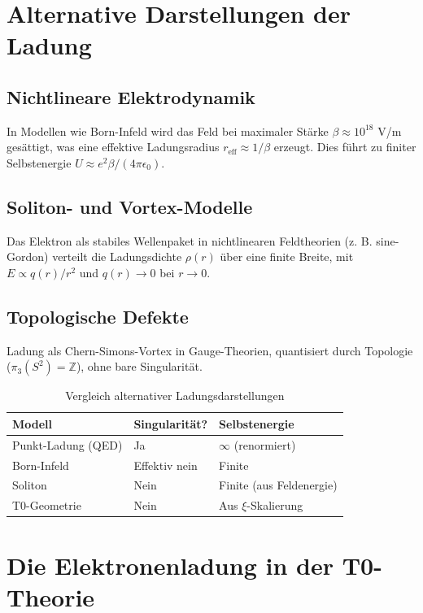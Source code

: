	\section{Alternative Darstellungen der Ladung}
	\label{sec:alternativen}
	
	\subsection{Nichtlineare Elektrodynamik}
	In Modellen wie Born-Infeld wird das Feld bei maximaler Stärke $\beta \approx 10^{18}$ V/m gesättigt, was eine effektive Ladungsradius $r_{\text{eff}} \approx 1/\beta$ erzeugt. Dies führt zu finiter Selbstenergie $U \approx e^2 \beta / (4\pi \epsilon_0)$.
	
	\subsection{Soliton- und Vortex-Modelle}
	Das Elektron als stabiles Wellenpaket in nichtlinearen Feldtheorien (z. B. sine-Gordon) verteilt die Ladungsdichte $\rho(r)$ über eine finite Breite, mit $E \propto q(r)/r^2$ und $q(r) \to 0$ bei $r \to 0$.
	
	\subsection{Topologische Defekte}
	Ladung als Chern-Simons-Vortex in Gauge-Theorien, quantisiert durch Topologie ($\pi_3(S^2) = \mathbb{Z}$), ohne bare Singularität.
	
	\begin{table}[h]
		\centering
		\begin{tabular}{lll}
			\toprule
			\textbf{Modell} & \textbf{Singularität?} & \textbf{Selbstenergie} \\
			\midrule
			Punkt-Ladung (QED) & Ja & $\infty$ (renormiert) \\
			Born-Infeld & Effektiv nein & Finite \\
			Soliton & Nein & Finite (aus Feldenergie) \\
			T0-Geometrie & Nein & Aus $\xi$-Skalierung \\
			\bottomrule
		\end{tabular}
		\caption{Vergleich alternativer Ladungsdarstellungen}
		\label{tab:vergleich}
	\end{table}
	
	\section{Die Elektronenladung in der T0-Theorie}
	\label{sec:t0-ladung}
	
